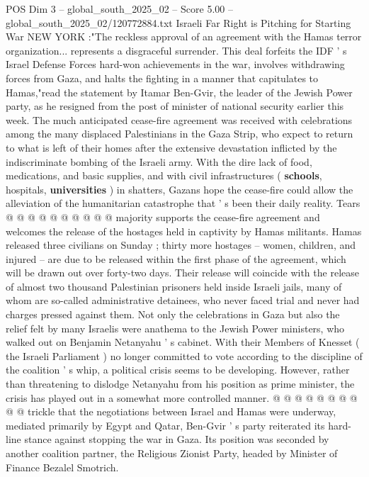 \begin{textsample}{POS Dim 3 – global\_south\_2025\_02 – Score 5.00 – global\_south\_2025\_02/120772884.txt}  \label{ex:f3_pos_445}
Israeli Far Right is Pitching for Starting War NEW YORK :"The reckless approval of an agreement with the Hamas terror organization... represents a disgraceful surrender.
This deal forfeits the IDF ' s Israel Defense Forces hard-won achievements in the war, involves withdrawing forces from Gaza, and halts the fighting in a manner that capitulates to Hamas,"read the statement by Itamar Ben-Gvir, the leader of the Jewish Power party, as he resigned from the post of minister of national security earlier this week.
The much anticipated cease-fire agreement was received with celebrations among the many displaced Palestinians in the Gaza Strip, who expect to return to what is left of their homes after the extensive devastation inflicted by the indiscriminate bombing of the Israeli army.
With the dire lack of food, medications, and basic supplies, and with civil infrastructures ( \textbf{schools}, hospitals, \textbf{universities} ) in shatters, Gazans hope the cease-fire could allow the alleviation of the humanitarian catastrophe that ' s been their daily reality.
Tears @ @ @ @ @ @ @ @ @ @ majority supports the cease-fire agreement and welcomes the release of the hostages held in captivity by Hamas militants.
Hamas released three civilians on Sunday ; thirty more hostages -- women, children, and injured -- are due to be released within the first phase of the agreement, which will be drawn out over forty-two days.
Their release will coincide with the release of almost two thousand Palestinian prisoners held inside Israeli jails, many of whom are so-called administrative detainees, who never faced trial and never had charges pressed against them.
Not only the celebrations in Gaza but also the relief felt by many Israelis were anathema to the Jewish Power ministers, who walked out on Benjamin Netanyahu ' s cabinet.
With their Members of Knesset ( the Israeli Parliament ) no longer committed to vote according to the discipline of the coalition ' s whip, a political crisis seems to be developing.
However, rather than threatening to dislodge Netanyahu from his position as prime minister, the crisis has played out in a somewhat more controlled manner. @ @ @ @ @ @ @ @ @ @ trickle that the negotiations between Israel and Hamas were underway, mediated primarily by Egypt and Qatar, Ben-Gvir ' s party reiterated its hard-line stance against stopping the war in Gaza.
Its position was seconded by another coalition partner, the Religious Zionist Party, headed by Minister of Finance Bezalel Smotrich.

\end{textsample}
